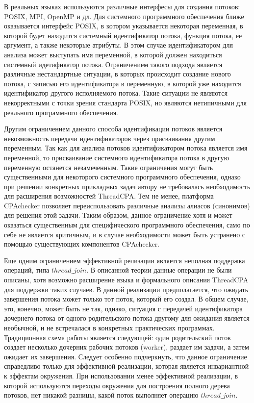 В реальных языках используются различные интерфесы для создания потоков: POSIX, MPI, OpenMP и дл. 
Для системного программного обеспечения ближе оказывается интерфейс POSIX, в котором указывается некоторая переменная, в которой будет находится системный идентификатор потока, функция потока, ее аргумент, а также некоторые атрибуты. 
В этом случае идентификатором для анализа может выступать имя переменной, в которой должен находиться системный идетификатор потока.
Ограничением такого подхода является различные нестандартные ситуации, в которых происходит создание нового потока, с записью его идентификатора в переменную, в которой уже находится идентификатор другого исполняемого потока.
Такие ситуации не являются некорректными с точки зрения стандарта POSIX, но являются нетипичными для реального программного обеспечения.

Другим ограничением данного способа идентификации потоков является невозможность передачи идентификаторов через присваивания другим переменным. 
Так как для анализа потоков идентификатором потока является имя переменной, то присваивание системного идентификатора потока в другую переменную останется незамеченным.
Такие ограничения могут быть существенными для некоторого системного программного обеспечения, однако при решении конкретных прикладных задач автору не требовалась необходимость для расширения возможностей ThreadCPA.
Тем не менее, платформа CPAchecker позволяет переиспользовать различные анализы алиасов (синонимов) для решения этой задачи. 
Таким образом, данное ограничение хотя и может оказаться существенным для специфического программного обеспечения, само по себе не является критичным, и в случае необходимости может быть устранено с помощью существующих компонентов CPAchecker.

Еще одним ограничением эффективной релизации является неполная поддержка операций, типа $thread\_join$. 
В описанной теории данные операции не были описаны, хотя возможно расширение языка и формального описания ThreadCPA для поддержки таких случаев. 
В данной реализации предполагается, что ожидать завершения потока может только тот поток, который его создал.
В общем случае, это, конечно, может быть не так, однако, ситуация с передачей идентификатора дочернего потока от одного родительского потока другому для ожидания является необычной, и не встречалася в конкретных практических программах. 
Традиционная схема работы является следующей: один родительский поток создает несколько дочерних рабочих потоков (worker), раздает им задачи, а затем ожидает их завершения. 
Следует особенно подчеркнуть, что данное ограничение справедливо только для эффективной реализации, которая является инвариантной к эффектам окружения.
При использовании менее эффективной реализации, в которой используются переходы окружения для построения полного дерева потоков, нет никакой разницы, какой поток выполняет операцию $thread\_join$.

